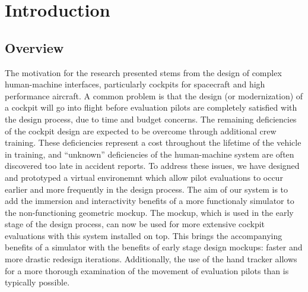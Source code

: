 \chapter{Introduction}

\section{Overview}
\label{overview}

The motivation for the research presented stems from the design of complex human-machine interfaces, particularly cockpits for spacecraft and high performance aircraft.
A common problem is that the design (or modernization) of a cockpit will go into flight before evaluation pilots are completely satisfied with the design process, due to time and budget concerns.
The remaining deficiencies of the cockpit design are expected to be overcome through additional crew training.
These deficiencies represent a cost throughout the lifetime of the vehicle in training, and ``unknown'' deficiencies of the human-machine system are often discovered too late in accident reports.
To address these issues, we have designed and prototyped a virtual environemnt which allow pilot evaluations to occur earlier and more frequently in the design process.
The aim of our system is to add the immersion and interactivity benefits of a more functionaly simulator to the non-functioning geometric mockup.
The mockup, which is used in the early stage of the design process, can now be used for more extensive cockpit evaluations with this system installed on top.
This brings the accompanying benefits of a simulator with the benefits of early stage design mockups: faster and more drastic redesign iterations.
Additionally, the use of the hand tracker allows for a more thorough examination of the movement of evaluation pilots than is typically possible.

